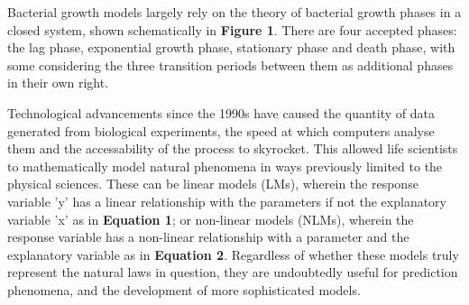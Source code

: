 \documentclass[11pt]{article}
\begin{document}
Bacterial growth models largely rely on the theory of bacterial growth phases in a closed system, shown schematically in \textbf{Figure 1}. There are four accepted phases: the lag phase, exponential growth phase, stationary phase and death phase, with some considering the three transition periods between them as additional phases in their own right.\parencite{Buchanan1918}



Technological advancements since the 1990s have caused the quantity of data generated from biological experiments, the speed at which computers analyse them and the accessability of the process to skyrocket. This allowed life scientists to mathematically model natural phenomena in ways previously limited to the physical sciences.\parencite{Bolker2013,Johnson2004} These can be linear models (LMs), wherein the response variable 'y' has a linear relationship with the parameters if not the explanatory variable 'x' as in \textbf{Equation 1}; or non-linear models (NLMs), wherein the response variable has a non-linear relationship with a parameter and the explanatory variable as in \textbf{Equation 2}.\parencite{Bolker2013} Regardless of whether these models truly represent the natural laws in question, they are undoubtedly useful for prediction phenomena, and the development of more sophisticated models.\parencite{Transtrum2016}
\end{document}
